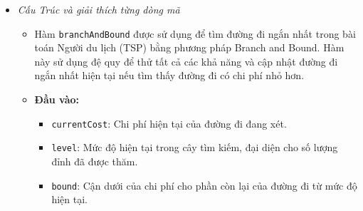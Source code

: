 \documentclass[a4paper]{article}
\begin{document}
\begin{itemize}
\item \textit{Cấu Trúc và giải thích từng dòng mã}
\begin{itemize}
    \item Hàm \texttt{branchAndBound} được sử dụng để tìm đường đi ngắn nhất trong bài toán Người du lịch (TSP) bằng phương pháp Branch and Bound. Hàm này sử dụng đệ quy để thử tất cả các khả năng và cập nhật đường đi ngắn nhất hiện tại nếu tìm thấy đường đi có chi phí nhỏ hơn.
\end{itemize}

\begin{itemize}
    \item \textbf{Đầu vào:}
    \begin{itemize}
        \item \texttt{currentCost}: Chi phí hiện tại của đường đi đang xét.
        \item \texttt{level}: Mức độ hiện tại trong cây tìm kiếm, đại diện cho số lượng đỉnh đã được thăm.
        \item \texttt{bound}: Cận dưới của chi phí cho phần còn lại của đường đi từ mức độ hiện tại.
    \end{itemize}


\end{itemize}
\end{itemize}
\end{document}
